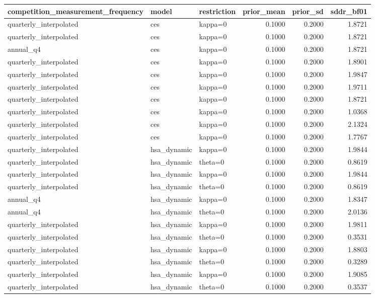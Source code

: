 \begin{tabular}{lllrrr}
\toprule
competition\_measurement\_frequency & model & restriction & prior\_mean & prior\_sd & sddr\_bf01 \\
\midrule
quarterly\_interpolated & ces & kappa=0 & 0.1000 & 0.2000 & 1.8721 \\
quarterly\_interpolated & ces & kappa=0 & 0.1000 & 0.2000 & 1.8721 \\
annual\_q4 & ces & kappa=0 & 0.1000 & 0.2000 & 1.8721 \\
quarterly\_interpolated & ces & kappa=0 & 0.1000 & 0.2000 & 1.8901 \\
quarterly\_interpolated & ces & kappa=0 & 0.1000 & 0.2000 & 1.9847 \\
quarterly\_interpolated & ces & kappa=0 & 0.1000 & 0.2000 & 1.9711 \\
quarterly\_interpolated & ces & kappa=0 & 0.1000 & 0.2000 & 1.8721 \\
quarterly\_interpolated & ces & kappa=0 & 0.1000 & 0.2000 & 1.0368 \\
quarterly\_interpolated & ces & kappa=0 & 0.1000 & 0.2000 & 2.1324 \\
quarterly\_interpolated & ces & kappa=0 & 0.1000 & 0.2000 & 1.7767 \\
quarterly\_interpolated & hsa\_dynamic & kappa=0 & 0.1000 & 0.2000 & 1.9844 \\
quarterly\_interpolated & hsa\_dynamic & theta=0 & 0.1000 & 0.2000 & 0.8619 \\
quarterly\_interpolated & hsa\_dynamic & kappa=0 & 0.1000 & 0.2000 & 1.9844 \\
quarterly\_interpolated & hsa\_dynamic & theta=0 & 0.1000 & 0.2000 & 0.8619 \\
annual\_q4 & hsa\_dynamic & kappa=0 & 0.1000 & 0.2000 & 1.8347 \\
annual\_q4 & hsa\_dynamic & theta=0 & 0.1000 & 0.2000 & 2.0136 \\
quarterly\_interpolated & hsa\_dynamic & kappa=0 & 0.1000 & 0.2000 & 1.9811 \\
quarterly\_interpolated & hsa\_dynamic & theta=0 & 0.1000 & 0.2000 & 0.3531 \\
quarterly\_interpolated & hsa\_dynamic & kappa=0 & 0.1000 & 0.2000 & 1.8803 \\
quarterly\_interpolated & hsa\_dynamic & theta=0 & 0.1000 & 0.2000 & 0.3289 \\
quarterly\_interpolated & hsa\_dynamic & kappa=0 & 0.1000 & 0.2000 & 1.9085 \\
quarterly\_interpolated & hsa\_dynamic & theta=0 & 0.1000 & 0.2000 & 0.3537 \\

\end{tabular}
